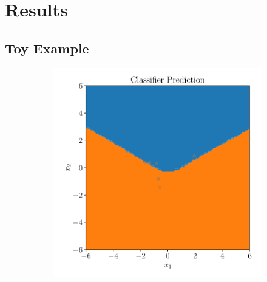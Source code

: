 \chapter{Results}%
\label{cha:results}


\section{Toy Example}%
\label{sec:toy_example}


\begin{figure}[htpb]
    \centering
    \begin{subfigure}[]{0.4\textwidth}
        \centering
        \includegraphics[width=\linewidth]{figures/toy_example/gaussian_mixture/classifier_class.pdf}
        \caption{}
        \label{fig:}
    \end{subfigure}
    \begin{subfigure}[]{0.4\textwidth}
        \centering

\end{subfigure}
\end{figure}
